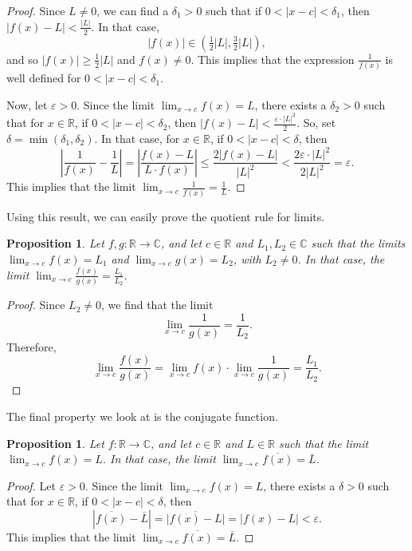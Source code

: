 \documentclass[a4paper, openany]{memoir}
\theoremstyle{definition}
\theoremstyle{plain}
\newtheorem{proposition}[definition]{Proposition}
\begin{document}
\begin{proof}
Since $L \neq 0$, we can find a $\delta_1 > 0$ such that if $0 < |x - c| < \delta_1$, then $|f(x) - L| < \frac{|L|}{2}$. In that case,
\[|f(x)| \in (\tfrac{1}{2} |L|, \tfrac{3}{2} |L|),\]
and so $|f(x)| \geqslant \frac{1}{2} |L|$ and $f(x) \neq 0$. This implies that the expression $\frac{1}{f(x)}$ is well defined for $0 < |x - c| < \delta_1$. 

\noindent Now, let $\varepsilon > 0$. Since the limit $\lim_{x \to c} f(x) = L$, there exists a $\delta_2 > 0$ such that for $x \in \mathbb{R}$, if $0 < |x - c| < \delta_2$, then $|f(x) - L| < \frac{\varepsilon \cdot |L|^2}{2}$. So, set $\delta = \min(\delta_1, \delta_2)$. In that case, for $x \in \mathbb{R}$, if $0 < |x - c| < \delta$, then
\[\left|\frac{1}{f(x)} - \frac{1}{L}\right| = \left|\frac{f(x) - L}{L \cdot f(x)}\right| \leqslant \frac{2 |f(x) - L|}{|L|^2} < \frac{2\varepsilon \cdot |L|^2}{2|L|^2} = \varepsilon.\]
This implies that the limit $\lim_{x \to c} \frac{1}{f(x)} = \frac{1}{L}$.
\end{proof}
\noindent Using this result, we can easily prove the quotient rule for limits.
\begin{proposition}
Let $f, g: \mathbb{R} \to \mathbb{C}$, and let $c \in \mathbb{R}$ and $L_1, L_2 \in \mathbb{C}$ such that the limits $\lim_{x \to c} f(x) = L_1$ and $\lim_{x \to c} g(x) = L_2$, with $L_2 \neq 0$. In that case, the limit $\lim_{x \to c} \frac{f(x)}{g(x)} = \frac{L_1}{L_2}$.
\end{proposition}
\begin{proof}
Since $L_2 \neq 0$, we find that the limit
\[\lim_{x \to c} \frac{1}{g(x)} = \frac{1}{L_2}.\]
Therefore, 
\[\lim_{x \to c} \frac{f(x)}{g(x)} = \lim_{x \to c} f(x) \cdot \lim_{x \to c} \frac{1}{g(x)} = \frac{L_1}{L_2}.\]
\end{proof}
\noindent The final property we look at is the conjugate function.
\begin{proposition}
Let $f: \mathbb{R} \to \mathbb{C}$, and let $c \in \mathbb{R}$ and $L \in \mathbb{R}$ such that the limit $\lim_{x \to c} f(x) = L$. In that case, the limit $\lim_{x \to c} \overline{f(x)} = \overline{L}$.
\end{proposition}
\begin{proof}
Let $\varepsilon > 0$. Since the limit $\lim_{x \to c} f(x) = L$, there exists a $\delta > 0$ such that for $x \in \mathbb{R}$, if $0 < |x - c| < \delta$, then
\[|\overline{f(x)} - \overline{L}| = \overline{|f(x) - L|} = |f(x) - L| < \varepsilon.\]
This implies that the limit $\lim_{x \to c} \overline{f(x)} = \overline{L}$.
\end{proof}
\end{document}
